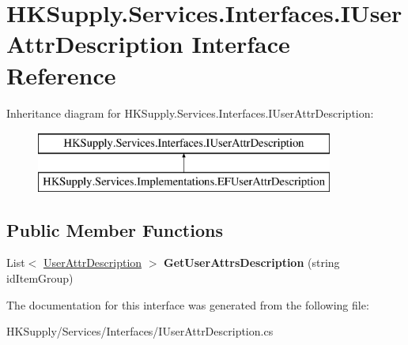 \hypertarget{interface_h_k_supply_1_1_services_1_1_interfaces_1_1_i_user_attr_description}{}\section{H\+K\+Supply.\+Services.\+Interfaces.\+I\+User\+Attr\+Description Interface Reference}
\label{interface_h_k_supply_1_1_services_1_1_interfaces_1_1_i_user_attr_description}
Inheritance diagram for H\+K\+Supply.\+Services.\+Interfaces.\+I\+User\+Attr\+Description\+:\begin{figure}[H]
\begin{center}
\leavevmode
\includegraphics[height=2.000000cm]{interface_h_k_supply_1_1_services_1_1_interfaces_1_1_i_user_attr_description}
\end{center}
\end{figure}
\subsection*{Public Member Functions}
\begin{DoxyCompactItemize}
\item 
\mbox{\label{interface_h_k_supply_1_1_services_1_1_interfaces_1_1_i_user_attr_description_a7399e8a05ed44470b652d16027756432}} 
List$<$ \mbox{\hyperlink{class_h_k_supply_1_1_models_1_1_user_attr_description}{User\+Attr\+Description}} $>$ {\bfseries Get\+User\+Attrs\+Description} (string id\+Item\+Group)
\end{DoxyCompactItemize}


The documentation for this interface was generated from the following file\+:\begin{DoxyCompactItemize}
\item 
H\+K\+Supply/\+Services/\+Interfaces/I\+User\+Attr\+Description.\+cs\end{DoxyCompactItemize}
